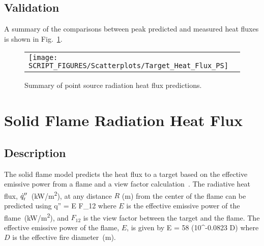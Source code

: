 

\clearpage


\subsection*{Validation}

A summary of the comparisons between peak predicted and measured heat fluxes is shown in Fig.~\ref{Target Heat Flux (Point Source)}.

\begin{figure}[!ht]
\begin{center}
\begin{tabular}{l}
\texttt{[image: SCRIPT\_FIGURES/Scatterplots/Target\_Heat\_Flux\_PS]}
\end{tabular}
\end{center}
\caption[Summary of point source radiation heat flux predictions]
{Summary of point source radiation heat flux predictions.}
\label{Target Heat Flux (Point Source)}
\end{figure}


\clearpage


\section{Solid Flame Radiation Heat Flux}
\label{sec:Solid_Flame_Radiation}

\subsection*{Description}

The solid flame model predicts the heat flux to a target based on the effective emissive power from a flame and a view factor calculation~\cite{Beyler2:SFPE}.
The radiative heat flux, $\dot q''\sb{r}$~(\si{kW/m^2}), at any distance $R$ (\si{m}) from the center of the flame can be predicted using
\be
\dot q'' = E F_{12}
\label{eq:solid_flame}
\ee
where $E$ is the effective emissive power of the flame~(\si{kW/m^2}), and $F_{12}$ is the view factor between the target and the flame.
The effective emissive power of the flame, $E$, is given by
\be
E = 58 (10^{-0.0823 D})
\label{eq:solid_flame_E}
\ee
where $D$ is the effective fire diameter~(\si{m}).

